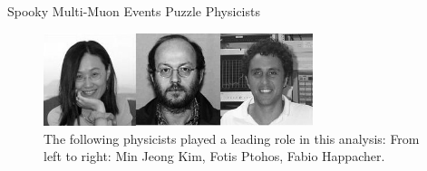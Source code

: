 \begin{MyArticle}[enhanced, tikz={rotate=0}, width=0.24\textwidth]{Spooky Multi-Muon Events Puzzle Physicists}
\begin{multicols}{2}
  \end{multicols}
    \begin{figure}
      \begin{center}
        \vspace{-0.2in}
        \leavevmode
        \includegraphics[width=0.7\textwidth]{./figures/Fotios-MinJeongKimBW.jpg}
        \caption*{The following physicists played a leading role in this analysis: From
          left to right: Min Jeong Kim, Fotis Ptohos, Fabio Happacher.}%
      \end{center}
    \end{figure}
  
\end{MyArticle}
